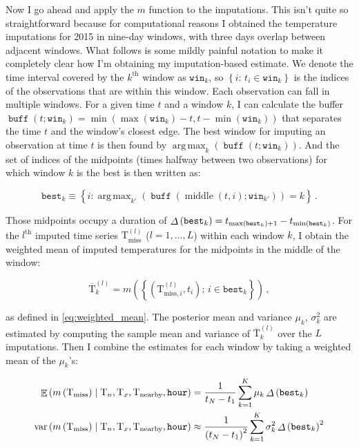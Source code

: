 \documentclass[letter]{article}
\newcommand{\genericdel}[3]{%
      \left#1#3\right#2
    }
\newcommand{\del}[1]{\genericdel(){#1}}
\newcommand{\cbr}[1]{\genericdel\{\}{#1}}
\DeclareMathOperator*{\argmax}{arg\,max}
\DeclareMathOperator{\E}{\mathbb{E}}
\DeclareMathOperator{\var}{{var}}
\newcommand{\T}{\mathrm{T}}
\newcommand{\Tn}{\T_{n}}
\newcommand{\Tx}{\T_{x}}
\newcommand{\miss}{\mathrm{miss}}
\newcommand{\obs}{\mathrm{nearby}}
\newcommand{\hour}{\mathtt{hour}}
\newcommand{\mean}{m}
\DeclareMathOperator{\midpoint}{middle}
\newcommand{\window}{\mathtt{win}}
\DeclareMathOperator{\buffer}{\mathtt{buff}}
\newcommand{\best}{\mathtt{best}}
\DeclareMathOperator{\timespan}{\mathnormal{\Delta}}
\begin{document}
        Now I go ahead and apply the \(\mean\) function to the imputations.
This isn't quite so straightforward because for computational reasons I obtained the temperature imputations for 2015 in nine-day windows, with three days overlap between adjacent windows.
What follows is some mildly painful notation to make it completely clear how I'm obtaining my imputation-based estimate.
We denote the time interval covered by the \(k^\text{th}\) window as \(\window_k\), so \(\cbr{i:\,t_i \in \window_k}\) is the indices of the observations that are within this window.
Each observation can fall in multiple windows.
For a given time \(t\) and a window \(k\), I can calculate the buffer \(\buffer(t; \window_k) = \min\del{\max\del{\window_k} - t, t - \min\del{\window_k}}\) that separates the time \(t\) and the window's closest edge.
The best window for imputing an observation at time \(t\) is then found by \(\argmax_k \del{\buffer\del{t; \window_k}}\).
And the set of indices of the midpoints (times halfway between two observations) for which window \(k\) is the best is then written as:

\begin{equation}
\best_k \equiv
\cbr{
    i: \argmax_{k'} \del{\buffer\del{\midpoint\del{t, i}; \window_{k'}}} = k
}\,.
\end{equation}

Those midpoints occupy a duration of \(\timespan\del{\best_k} = t_{\max\del{\best_k}+1} - t_{\min\del{\best_k}}\).
For the \(l^\text{th}\) imputed time series \(\T_\miss^{(l)}\) (\(l=1,\dotsc,L\)) within each window \(k\), I obtain the weighted mean of imputed temperatures for the midpoints in the middle of the window:

\begin{equation}
    \overline{\T}_{k}^{(l)} = \mean\del{
            \cbr{
                \del{\T_{\miss,i}^{(l)},t_i} ;\,i \in \best_k
            }
        }
         \,,
\end{equation}

as defined in \eqref{eq:weighted_mean}.
The posterior mean and variance \(\mu_k\), \(\sigma^2_k\) are estimated by computing the sample mean and variance of \(\overline{\T}_{k}^{(l)}\) over the \(L\) imputations.
Then I combine the estimates for each window by taking a weighted mean of the \(\mu_k\)'s:

\begin{equation}
\begin{split}
    \E\del{\mean\del{\T_\miss} \mid \Tn, \Tx, \T_\obs, \hour} 
    &=
    \frac{1}{t_N - t_1} \sum_{k=1}^K \mu_k \timespan\del{\best_k} \\
    \var\del{\mean\del{\T_\miss} \mid \Tn, \Tx, \T_\obs, \hour} 
    &\approx \frac{1}{\del{t_N - t_1}^2} \sum_{k=1}^K \sigma^2_k \timespan\del{\best_k}^2 \\
\end{split}
\end{equation}
\end{document}

